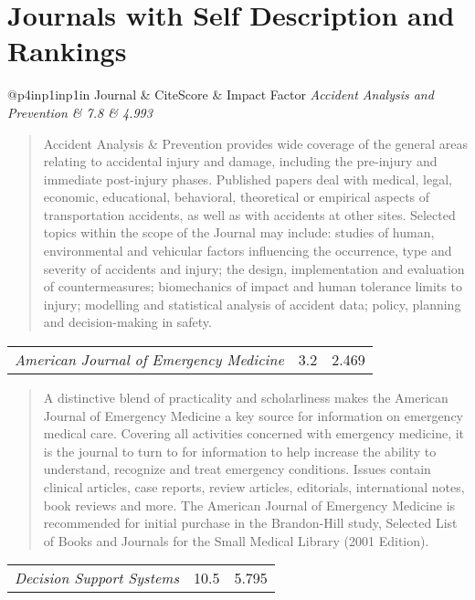 \section{Journals with Self Description and Rankings}
\label{sec:Journals}

\noindent\begin{tabular}{@{}p{4in}p{1in}p{1in}}
	Journal & CiteScore & Impact Factor \cr\hline
	\it Accident Analysis and Prevention & 7.8 & 4.993 \cr
\end{tabular}

\begin{quote}
Accident Analysis \& Prevention provides wide coverage of the general areas relating to accidental injury and damage, including the pre-injury and immediate post-injury phases. Published papers deal with medical, legal, economic, educational, behavioral, theoretical or empirical aspects of transportation accidents, as well as with accidents at other sites. Selected topics within the scope of the Journal may include: studies of human, environmental and vehicular factors influencing the occurrence, type and severity of accidents and injury; the design, implementation and evaluation of countermeasures; biomechanics of impact and human tolerance limits to injury; modelling and statistical analysis of accident data; policy, planning and decision-making in safety. 
\end{quote}

\noindent\begin{tabular}{@{}p{4in}p{1in}p{1in}}
	\it American Journal of Emergency Medicine & 3.2 & 2.469 \cr
\end{tabular}

	\begin{quote}
	A distinctive blend of practicality and scholarliness makes the American Journal of Emergency Medicine a key source for information on emergency medical care. Covering all activities concerned with emergency medicine, it is the journal to turn to for information to help increase the ability to understand, recognize and treat emergency conditions. Issues contain clinical articles, case reports, review articles, editorials, international notes, book reviews and more. The American Journal of Emergency Medicine is recommended for initial purchase in the Brandon-Hill study, Selected List of Books and Journals for the Small Medical Library (2001 Edition).
	\end{quote}

\noindent\begin{tabular}{@{}p{4in}p{1in}p{1in}}
	\it Decision Support Systems & 10.5 & 5.795 \cr
\end{tabular}

